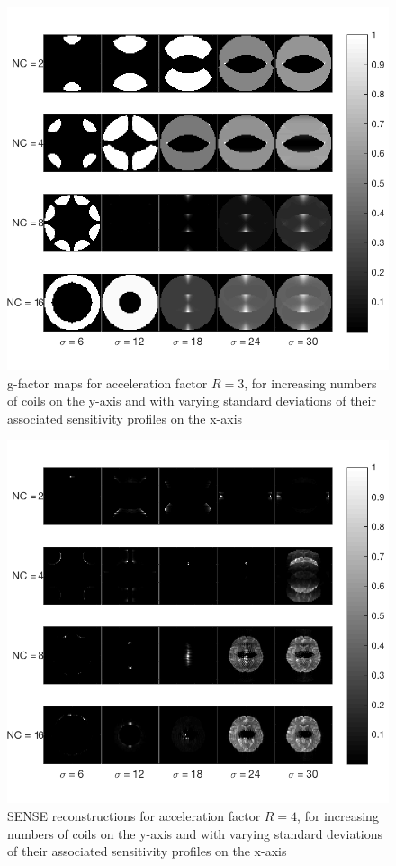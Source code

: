 \begin{figure}[H]
    \centering
    \includegraphics[width=1\textwidth,keepaspectratio]{R3gfactb}
    \caption{g-factor maps for acceleration factor $R = 3$, for increasing numbers of coils on the y-axis and with varying standard deviations of their associated sensitivity profiles on the x-axis}
    \label{fig:R3gfact}
\end{figure}

\begin{figure}[H]
    \centering
    \includegraphics[width=1\textwidth,keepaspectratio]{R4brainsb}
    \caption{SENSE reconstructions for acceleration factor $R = 4$, for increasing numbers of coils on the y-axis and with varying standard deviations of their associated sensitivity profiles on the x-axis}
    \label{fig:R4brains}
\end{figure}

